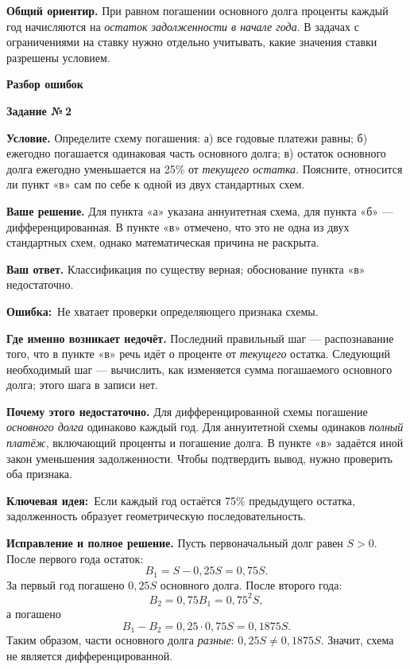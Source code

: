 \documentclass[a4paper,11pt]{article}
\newcommand{\wrong}{\textcolor{error}{\textbf{Ошибка:}}}
\newcommand{\idea}{\textcolor{deep}{\textbf{Ключевая идея:}}}
\newcommand{\tasktitle}[1]{\phantomsection\label{task:#1}{\Large\color{deep}\textbf{Задание №\,#1}}\par\vspace{4mm}}
\begin{document}
\vspace{10mm}
{\color{deep}\textbf{Общий ориентир.}} При равном погашении основного долга
проценты каждый год начисляются на \emph{остаток задолженности в начале года}.
В задачах с ограничениями на ставку нужно отдельно учитывать, какие значения
ставки разрешены условием.

\clearpage
\thispagestyle{empty}
\vspace*{\fill}
\begin{center}
{\LARGE\color{deep}\textbf{Разбор ошибок}}
\end{center}
\vspace*{\fill}

\clearpage
\tasktitle{2}
{\textbf{Условие.}} Определите схему погашения: 
а) все годовые платежи равны;
б) ежегодно погашается одинаковая часть основного долга;
в) остаток основного долга ежегодно уменьшается на 25\% от \emph{текущего остатка}.
Поясните, относится ли пункт «в» сам по себе к одной из двух стандартных схем.

\textbf{Ваше решение.} Для пункта «а» указана аннуитетная схема, для пункта «б» ---
дифференцированная. В пункте «в» отмечено, что это не одна из двух стандартных
схем, однако математическая причина не раскрыта.

\textbf{Ваш ответ.} Классификация по существу верная; обоснование пункта «в»
недостаточно.

\wrong\ Не хватает проверки определяющего признака схемы.

\textbf{Где именно возникает недочёт.} Последний правильный шаг ---
распознавание того, что в пункте «в» речь идёт о проценте от \emph{текущего}
остатка. Следующий необходимый шаг --- вычислить, как изменяется сумма
погашаемого основного долга; этого шага в записи нет.

\textbf{Почему этого недостаточно.} Для дифференцированной схемы погашение
\emph{основного долга} одинаково каждый год. Для аннуитетной схемы одинаков
\emph{полный платёж}, включающий проценты и погашение долга. В пункте «в»
задаётся иной закон уменьшения задолженности. Чтобы подтвердить вывод,
нужно проверить оба признака.

\idea\ Если каждый год остаётся 75\% предыдущего остатка, задолженность
образует геометрическую последовательность.

\textbf{Исправление и полное решение.} Пусть первоначальный долг равен
\(S>0\). После первого года остаток:
\[
B_1=S-0{,}25S=0{,}75S.
\]
За первый год погашено \(0{,}25S\) основного долга. После второго года:
\[
B_2=0{,}75B_1=0{,}75^2S,
\]
а погашено
\[
B_1-B_2=0{,}25\cdot0{,}75S=0{,}1875S.
\]
Таким образом, части основного долга \emph{разные}:
\(0{,}25S\ne0{,}1875S\).
Значит, схема не является дифференцированной.
\end{document}
